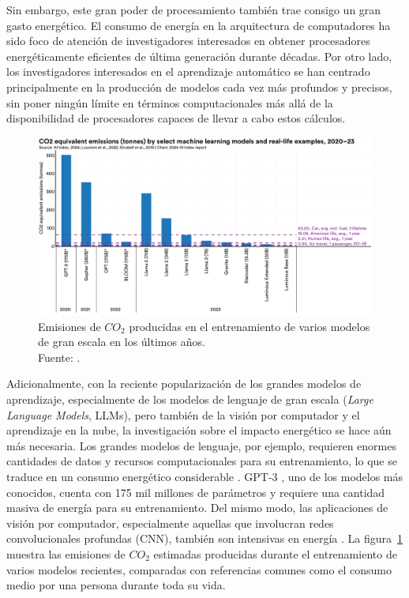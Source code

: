 Sin embargo, este gran poder de procesamiento también trae consigo un gran gasto energético.
El consumo de energía en la arquitectura de computadores ha sido foco de atención de investigadores interesados en obtener procesadores energéticamente eficientes de última generación durante décadas. 
Por otro lado, los investigadores interesados en el aprendizaje automático se han centrado principalmente en la producción de modelos cada vez más profundos y precisos, sin poner ningún límite en términos computacionales más allá de la disponibilidad de procesadores capaces de llevar a cabo estos cálculos\cite{eva2019review}.

\begin{figure}[H]
  \centering
  \includegraphics[width=\textwidth,keepaspectratio]{img/fig_2.13.1-ai-index.pdf}
  \caption{Emisiones de $CO_2$ producidas en el entrenamiento de varios modelos de gran escala en los últimos años. \\ Fuente:  \cite{maslej2024aiindex}.}
  \label{fig:ai-index-emissions}
\end{figure}

Adicionalmente, con la reciente popularización de los grandes modelos de aprendizaje, especialmente de los modelos de lenguaje de gran escala (\textit{Large Language Models}, LLMs), pero también de la visión por computador y el aprendizaje en la nube, la investigación sobre el impacto energético se hace aún más necesaria. Los grandes modelos de lenguaje, por ejemplo, requieren enormes cantidades de datos y recursos computacionales para su entrenamiento, lo que se traduce en un consumo energético considerable \cite{samsi2023}. \mbox{GPT-3} \cite{brown2020language}, uno de los modelos más conocidos, cuenta con 175 mil millones de parámetros y requiere una cantidad masiva de energía para su entrenamiento. Del mismo modo, las aplicaciones de visión por computador, especialmente aquellas que involucran redes convolucionales profundas (CNN), también son intensivas en energía \cite{alyamkin2019low}. La figura~\ref{fig:ai-index-emissions} muestra las emisiones de $CO_2$ estimadas producidas durante el entrenamiento de varios modelos recientes, comparadas con referencias comunes como el consumo medio por una persona durante toda su vida.

